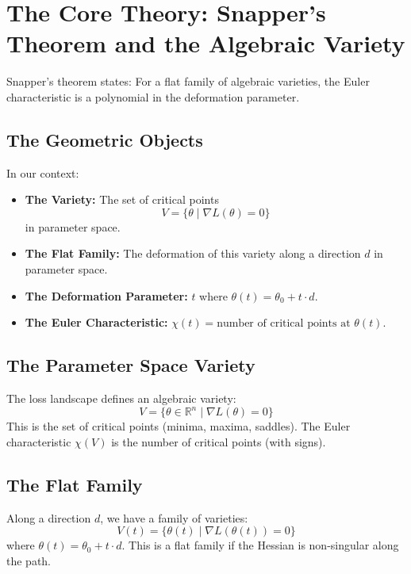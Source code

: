 \documentclass[11pt]{amsart}
\begin{document}
\newpage
\section{The Core Theory: Snapper's Theorem and the Algebraic Variety}
\label{sec:core_theory}


Snapper's theorem states: For a flat family of algebraic varieties, the Euler characteristic is a polynomial in the deformation parameter.

\subsection{The Geometric Objects}

In our context:
\begin{itemize}
    \item \textbf{The Variety:} The set of critical points 
    \[
    V = \{\theta \mid \nabla L(\theta) = 0\}
    \]
    in parameter space.
    
    \item \textbf{The Flat Family:} The deformation of this variety along a direction $d$ in parameter space.
    
    \item \textbf{The Deformation Parameter:} $t$ where $\theta(t) = \theta_0 + t\cdot d$.
    
    \item \textbf{The Euler Characteristic:} $\chi(t) = \text{number of critical points at } \theta(t)$.
\end{itemize}

\subsection{The Parameter Space Variety}

The loss landscape defines an algebraic variety:
\[
V = \{\theta \in \mathbb{R}^n \mid \nabla L(\theta) = 0\}
\]
This is the set of critical points (minima, maxima, saddles). The Euler characteristic $\chi(V)$ is the number of critical points (with signs).

\subsection{The Flat Family}

Along a direction $d$, we have a family of varieties:
\[
V(t) = \{\theta(t) \mid \nabla L(\theta(t)) = 0\}
\]
where $\theta(t) = \theta_0 + t\cdot d$. This is a flat family if the Hessian is non-singular along the path.
\end{document}

